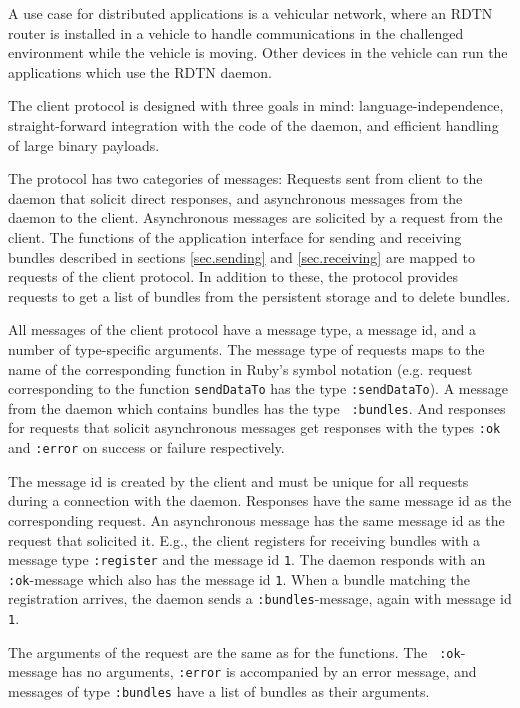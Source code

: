 \documentclass[a4paper]{article}
\begin{document}
A use case for distributed applications is a vehicular network, where an RDTN
router is installed in a vehicle to handle communications in the challenged
environment while the vehicle is moving. Other devices in the vehicle can run
the applications which use the RDTN daemon.

The client protocol is designed with three goals in mind: language-independence,
straight-forward integration with the code of the daemon, and efficient
handling of large binary payloads. 

The protocol has two categories of messages: Requests sent from client to the
daemon that solicit direct responses, and asynchronous messages from the daemon
to the client. Asynchronous messages are solicited by a request from the client.
The functions of the application interface for sending and receiving bundles described in sections
\ref{sec.sending} and \ref{sec.receiving} are mapped to requests of the client
protocol. In addition to these, the protocol provides requests to get a list of
bundles from the persistent storage and to delete bundles.

All messages of the client protocol have a message type, a message id, and a
number of type-specific arguments. The message type of requests maps to the name
of the corresponding function in Ruby's symbol notation (e.g. request
corresponding to the function {\tt sendDataTo} has the type {\tt :sendDataTo}).
A message from the daemon which contains bundles has the type {\tt
:bundles}. And responses for requests that solicit asynchronous messages get
responses with the types {\tt :ok} and {\tt :error} on success or failure
respectively.

The message id is created by the client and must be unique for all requests
during a connection with the daemon. Responses have the same message id as the
corresponding request. An asynchronous message has the same message id as the
request that solicited it. E.g., the client registers for receiving bundles with
a message type {\tt :register} and the message id {\tt 1}. The daemon responds
with an {\tt :ok}-message which also has the message id {\tt 1}. When a bundle
matching the registration arrives, the daemon sends a {\tt :bundles}-message,
again with message id {\tt 1}.

The arguments of the request are the same as for the functions. The {\tt
:ok}-message has no arguments, {\tt :error} is accompanied by an error message,
and messages of type {\tt :bundles} have a list of bundles as their arguments.
\end{document}
